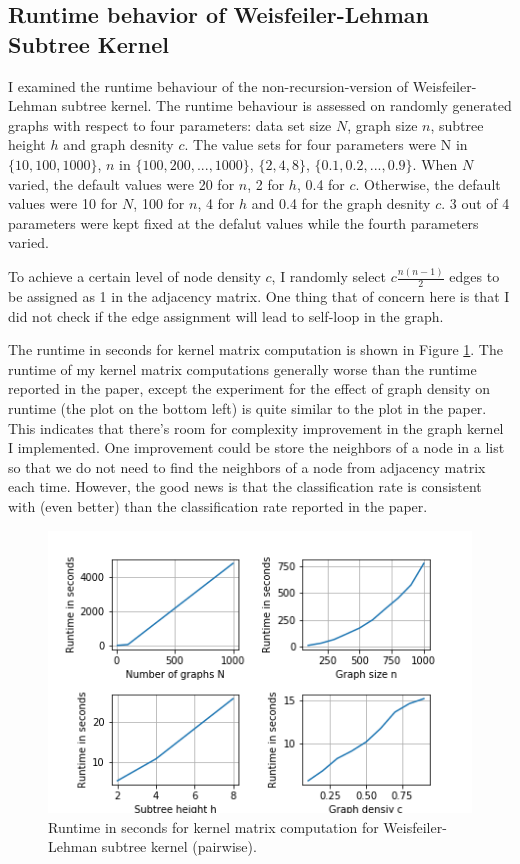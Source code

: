 \documentclass{llncs}
\begin{document}
\subsection{Runtime behavior of Weisfeiler-Lehman Subtree Kernel}

I examined the runtime behaviour of the non-recursion-version of Weisfeiler-Lehman subtree kernel. The runtime behaviour is assessed on randomly generated graphs with respect to four parameters: data set size $N$, graph size $n$, subtree height $h$ and graph desnity $c$. The value sets for four parameters were N in $\{10, 100, 1000\}$, $n$ in $\{100, 200, ..., 1000\}$, $\{2, 4, 8\}$, $\{0.1, 0.2, ..., 0.9\}$. When $N$ varied, the default values were 20 for $n$, 2 for $h$, 0.4 for $c$. Otherwise, the default values were 10 for $N$, 100 for $n$, 4 for $h$ and 0.4 for the graph desnity $c$. 3 out of 4 parameters were kept fixed at the defalut values while the fourth parameters varied. 


To achieve a certain level of node density $c$, I randomly select $c\frac{n(n-1)}{2}$ edges to be assigned as 1 in the adjacency matrix. One thing that of concern here is that I did not check if the edge assignment will lead to self-loop in the graph.  

The runtime in seconds for kernel matrix computation is shown in Figure \ref{1}. The runtime of my kernel matrix computations generally worse than the runtime reported in the paper, except the experiment for the effect of graph density on runtime (the plot on the bottom left) is quite similar to the plot in the paper. This indicates that there's room for complexity improvement in the graph kernel I implemented. One improvement could be store the neighbors of a node in a list so that we do not need to find the neighbors of a node from adjacency matrix each time. However, the good news is that the classification rate is consistent with (even better) than the classification rate reported in the paper. 

\begin{figure}[h]
\centering
\includegraphics[width=\textwidth]{runtime}
\caption{Runtime in seconds for kernel matrix computation for Weisfeiler-Lehman subtree kernel (pairwise).}
\label{1}
\end{figure}
\end{document}
